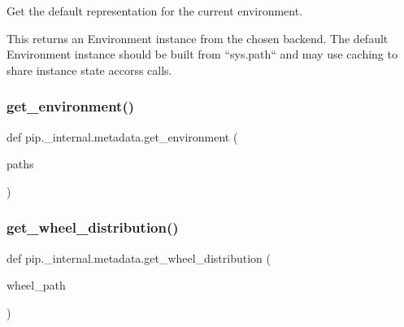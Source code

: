 \begin{DoxyVerb}Get the default representation for the current environment.

This returns an Environment instance from the chosen backend. The default
Environment instance should be built from ``sys.path`` and may use caching
to share instance state accorss calls.
\end{DoxyVerb}
 \mbox{\label{namespacepip_1_1__internal_1_1metadata_a71294b12a0a33814e0a35ef08efd607f}} 
\subsubsection{\texorpdfstring{get\+\_\+environment()}{get\_environment()}}
{\footnotesize\ttfamily def pip.\+\_\+internal.\+metadata.\+get\+\_\+environment (\begin{DoxyParamCaption}\item[{}]{paths }\end{DoxyParamCaption})}

\mbox{\label{namespacepip_1_1__internal_1_1metadata_a2239286f23e90105939d56514e0d2ebd}} 
\subsubsection{\texorpdfstring{get\+\_\+wheel\+\_\+distribution()}{get\_wheel\_distribution()}}
{\footnotesize\ttfamily def pip.\+\_\+internal.\+metadata.\+get\+\_\+wheel\+\_\+distribution (\begin{DoxyParamCaption}\item[{}]{wheel\+\_\+path }\end{DoxyParamCaption})}

